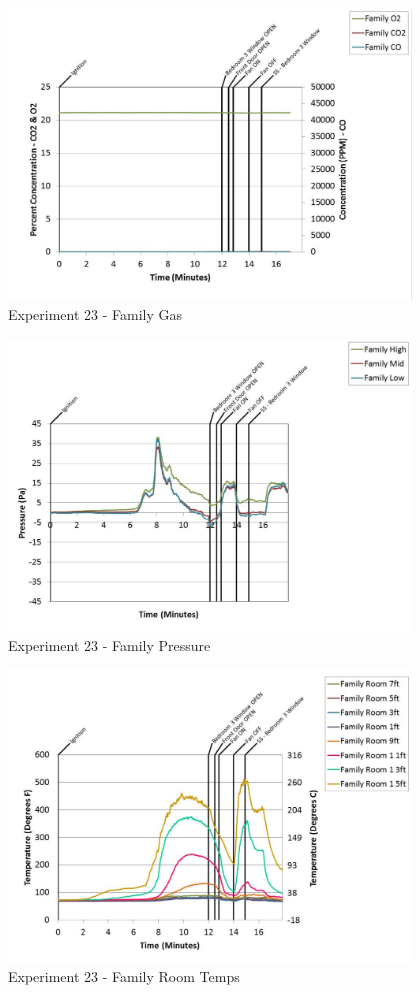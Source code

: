 \documentclass{article}
\begin{document}
\begin{appendices}
	\clearpage

	\begin{figure}[h!]
		\centering
		\includegraphics[height=3.05in]{0_Images/Results_Charts/Exp_23_Charts/FamilyGas.pdf}
		\caption{Experiment 23 - Family Gas}
	\end{figure}
 

	\begin{figure}[h!]
		\centering
		\includegraphics[height=3.05in]{0_Images/Results_Charts/Exp_23_Charts/FamilyPressure.pdf}
		\caption{Experiment 23 - Family Pressure}
	\end{figure}
 
	\clearpage

	\begin{figure}[h!]
		\centering
		\includegraphics[height=3.05in]{0_Images/Results_Charts/Exp_23_Charts/FamilyRoomTemps.pdf}
		\caption{Experiment 23 - Family Room Temps}
	\end{figure}
 


\end{appendices}
\end{document}

